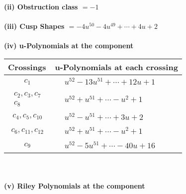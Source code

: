 \documentclass[1p]{elsarticle_modified}
\theoremstyle{definition}
\begin{document}
\flushleft \textbf{(ii) Obstruction class $= -1$}\\~\\
\flushleft \textbf{(iii) Cusp Shapes $= -4 u^{50}-4 u^{49}+\cdots+4 u+2$}\\~\\
\newpage\renewcommand{\arraystretch}{1}
\flushleft \textbf{(iv) u-Polynomials at the component}\newline \\
\begin{tabular}{m{50pt}|m{274pt}}
Crossings & \hspace{64pt}u-Polynomials at each crossing \\
\hline $$\begin{aligned}c_{1}\end{aligned}$$&$\begin{aligned}
&u^{52}-13 u^{51}+\cdots+12 u+1
\end{aligned}$\\
\hline $$\begin{aligned}c_{2},c_{3},c_{7}\\c_{8}\end{aligned}$$&$\begin{aligned}
&u^{52}+u^{51}+\cdots- u^2+1
\end{aligned}$\\
\hline $$\begin{aligned}c_{4},c_{5},c_{10}\end{aligned}$$&$\begin{aligned}
&u^{52}- u^{51}+\cdots+3 u+2
\end{aligned}$\\
\hline $$\begin{aligned}c_{6},c_{11},c_{12}\end{aligned}$$&$\begin{aligned}
&u^{52}+u^{51}+\cdots- u^2+1
\end{aligned}$\\
\hline $$\begin{aligned}c_{9}\end{aligned}$$&$\begin{aligned}
&u^{52}-5 u^{51}+\cdots-40 u+16
\end{aligned}$\\
\hline
\end{tabular}\\~\\
\newpage\renewcommand{\arraystretch}{1}
\flushleft \textbf{(v) Riley Polynomials at the component}\newline \\
\end{document}

